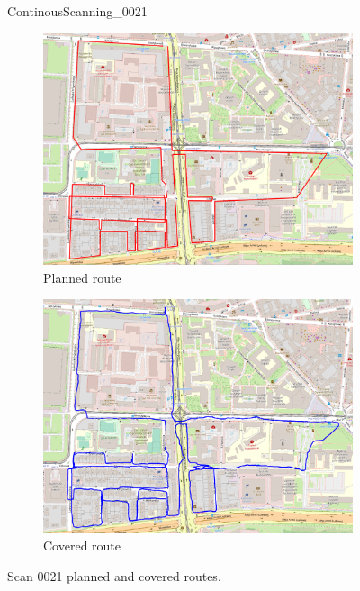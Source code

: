 \documentclass[a4paper,12pt]{book}
\begin{document}
\begin{enumerate}
\begin{figure}[H]
		\caption{ContinousScanning\_0021}
	\end{figure}
	\begin{figure}[H]
		\centering
		\begin{subfigure}{.90\textwidth}
			\centering
			\includegraphics[width=1\linewidth]{route_p21}
			\caption{Planned route}
			\label{fig:a21}
		\end{subfigure}%
		\linebreak
		\begin{subfigure}{.90\textwidth}
			\centering
			\includegraphics[width=1\linewidth]{route_c21}
			\caption{Covered route}
			\label{fig:b21}
		\end{subfigure}
		\caption{Scan 0021 planned and covered routes.}
		\label{fig:fig21}
	\end{figure} 
\end{enumerate}
\end{document}
